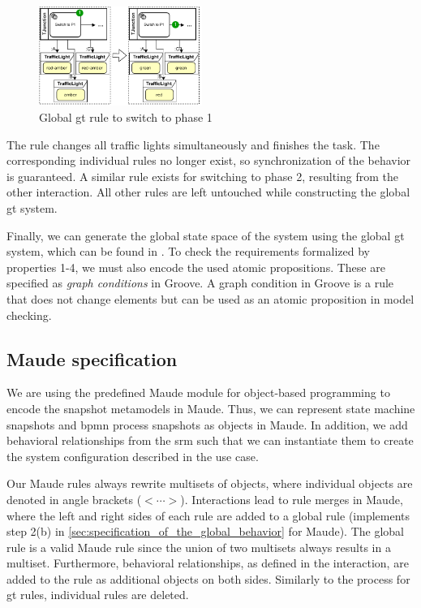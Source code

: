 \documentclass{jot}
\begin{document}
\begin{figure}[h]
    \centering
    \includegraphics[width=0.475\textwidth]{figures/global_rule.pdf}
    \caption{Global \gls*{gt} rule to switch to phase 1}
    \label{fig:global_rule}
\end{figure}

The rule changes all traffic lights simultaneously and finishes the task.
The corresponding individual rules no longer exist, so synchronization of the behavior is guaranteed.
A similar rule exists for switching to phase 2, resulting from the other interaction.
All other rules are left untouched while constructing the global \gls*{gt} system.

Finally, we can generate the global state space of the system using the global \gls*{gt} system, which can be found in \cite{krauterArtifactsBehavioralConsistency2022}.
To check the requirements formalized by properties 1-4, we must also encode the used atomic propositions.
These are specified as \emph{graph conditions} in Groove.
A graph condition in Groove is a rule that does not change elements but can be used as an atomic proposition in model checking.


\subsection{Maude specification}
We are using the predefined Maude module for object-based programming to encode the snapshot metamodels in Maude.
Thus, we can represent state machine snapshots and \gls*{bpmn} process snapshots as objects in Maude.
In addition, we add behavioral relationships from the \gls*{srm} such that we can instantiate them to create the system configuration described in the use case.

Our Maude rules always rewrite multisets of objects, where individual objects are denoted in angle brackets ($<\cdots>$).
Interactions lead to rule merges in Maude, where the left and right sides of each rule are added to a global rule (implements step 2(b) in \cref{sec:specification_of_the_global_behavior} for Maude).
The global rule is a valid Maude rule since the union of two multisets always results in a multiset. 
Furthermore, behavioral relationships, as defined in the interaction, are added to the rule as additional objects on both sides.
Similarly to the process for \gls*{gt} rules, individual rules are deleted.
\end{document}
